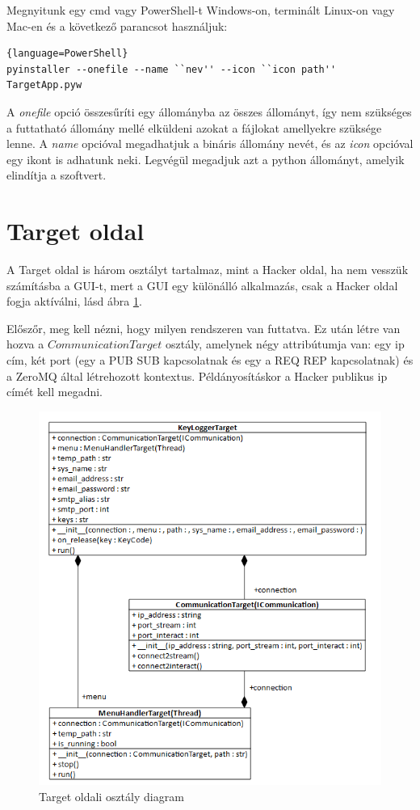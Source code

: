 \documentclass[12pt,a4paper,oneside]{report}
\begin{document}
Megnyitunk egy cmd vagy PowerShell-t Windows-on, terminált Linux-on vagy Mac-en és a következő parancsot használjuk:
\begin{lstlisting}{language=PowerShell}
pyinstaller --onefile --name ``nev'' --icon ``icon path'' TargetApp.pyw
\end{lstlisting}

A \textit{onefile} opció összesűríti egy állományba az összes állományt, így nem szükséges a futtatható állomány mellé elküldeni azokat a fájlokat amellyekre szüksége lenne. A \textit{name} opcióval megadhatjuk a bináris állomány nevét, és az \textit{icon} opcióval egy ikont is adhatunk neki. Legvégül megadjuk azt a python állományt, amelyik elindítja a szoftvert.

\section{Target oldal}\label{subsec:client}
A Target oldal is három osztályt tartalmaz, mint a Hacker oldal, ha nem vesszük számításba a GUI-t, mert a GUI egy különálló alkalmazás, csak a Hacker oldal fogja aktíválni, lásd ábra \ref{fig:clientclassdia}.

Előszőr, meg kell nézni, hogy milyen rendszeren van futtatva. Ez után létre van hozva a $CommunicationTarget$ osztály, amelynek négy attribútumja van: egy ip cím, két port (egy a PUB SUB kapcsolatnak és egy a REQ REP kapcsolatnak) és a ZeroMQ által létrehozott kontextus. Példányosításkor a Hacker publikus ip címét kell megadni.

\begin{figure}[H]
\centering
\includegraphics[width=400pt]{../images/targetclassdiagram}
\caption{Target oldali osztály diagram}
\label{fig:clientclassdia}
\end{figure}
\end{document}
